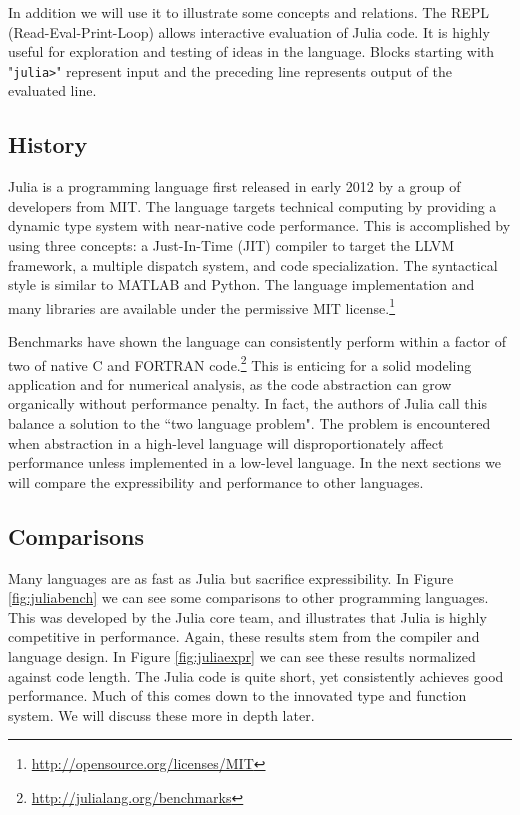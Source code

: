 \documentclass[a4paper]{article}
\begin{document}
In addition we will use it to illustrate some concepts and relations.
The REPL (Read-Eval-Print-Loop) allows interactive
evaluation of Julia code. It is highly useful for exploration and testing of
ideas in the language.
Blocks starting with "\texttt{julia>}" represent input and the preceding
line represents output of the evaluated line.

\subsection{History}
Julia is a programming language first released in early 2012 by a group of
developers from MIT. The language targets technical computing by providing a
dynamic type system with near-native code performance. This is accomplished by
using three concepts: a Just-In-Time (JIT) compiler to target the LLVM framework,
a multiple dispatch system, and code specialization.\cite{bezanson2012julia}
\cite{Bezanson_Edelman_Karpinski_Shah_2014}
The syntactical style is similar to MATLAB and Python.
The language implementation and many libraries are available under the
permissive MIT license.\footnote{\url{http://opensource.org/licenses/MIT}}

Benchmarks have shown the language can consistently perform within a factor of
two of native C and FORTRAN code.\footnote{\url{http://julialang.org/benchmarks}}
This is enticing for a solid modeling application and for numerical analysis,
as the code abstraction can grow organically without performance penalty.
In fact, the authors of Julia call this balance a solution to the 
``two language problem". The problem is encountered when abstraction in a
high-level language will disproportionately affect performance unless
implemented in a low-level language. In the next sections we will compare
the expressibility and performance to other languages.

\subsection{Comparisons}

Many languages are as fast as Julia but sacrifice expressibility.
In Figure \ref{fig:juliabench} we can see some comparisons to other programming
languages. This was developed by the Julia core team, and illustrates that
Julia is highly competitive in performance. Again, these results stem from
the compiler and language design. In Figure \ref{fig:juliaexpr} we can see
these results normalized against code length. The Julia code is quite short,
yet consistently achieves good performance.
Much of this comes down to the innovated type and function system. We will
discuss these more in depth later.
\end{document}

